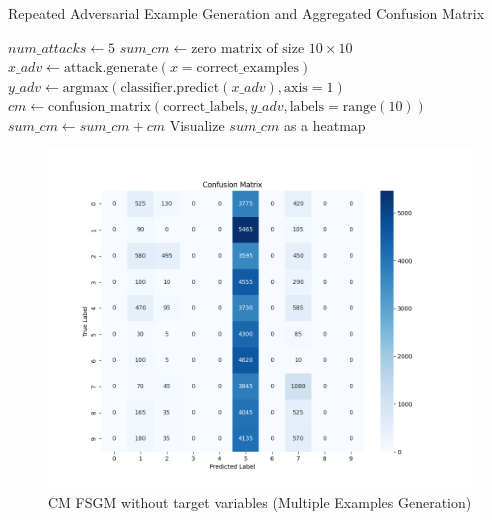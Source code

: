 \documentclass[11pt,onside]{article}
\begin{document}
\begin{algorithm}[H]
\caption{Repeated Adversarial Example Generation and Aggregated Confusion Matrix}
\begin{algorithmic}[1]
\State $num\_attacks \gets 5$
\State $sum\_cm \gets \text{zero matrix of size } 10 \times 10$
    \State $x\_adv \gets \text{attack.generate}(x=\text{correct\_examples})$
    \State $y\_adv \gets \text{argmax}(\text{classifier.predict}(x\_adv), \text{axis}=1)$
    \State $cm \gets \text{confusion\_matrix}(\text{correct\_labels}, y\_adv, \text{labels}=\text{range}(10))$
    \State $sum\_cm \gets sum\_cm + cm$
\EndFor
\State Visualize $sum\_cm$ as a heatmap
\end{algorithmic}
\end{algorithm}

\begin{figure}[h]
\centering
\includegraphics[width=1\textwidth]{V1_images/mul_attacks_FGM_without_target.png}
\caption{CM FSGM without target variables (Multiple Examples Generation)}
\label{fig:FSGM without target variables (Multiple Examples Generation)}
\end{figure}
\end{document}
